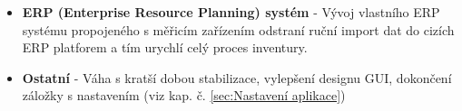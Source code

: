 \begin{itemize}
    \item \textbf{ERP (Enterprise Resource Planning) systém} - Vývoj vlastního ERP systému propojeného s měřicím zařízením odstraní ruční import dat do cizích ERP platforem a tím urychlí celý proces inventury.

    \item \textbf{Ostatní} - Váha s kratší dobou stabilizace, vylepšení designu GUI, dokončení záložky s nastavením (viz kap. č. \ref{sec:Nastavení aplikace})

\end{itemize}

    



